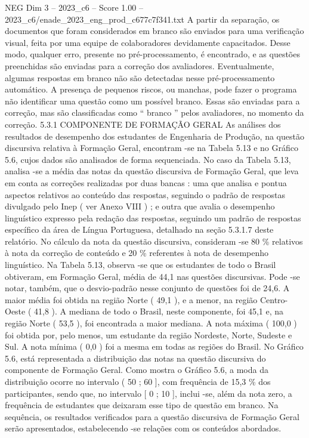 \begin{textsample}{NEG Dim 3 – 2023\_c6 – Score 1.00 – 2023\_c6/enade\_2023\_eng\_prod\_c677c7f341.txt}
A partir da separação, os documentos que foram considerados em branco são enviados para uma verificação visual, feita por uma equipe de colaboradores devidamente capacitados.
Desse modo, qualquer erro, presente no pré-processamento, é encontrado, e as questões preenchidas são enviadas para a correção dos avaliadores.
Eventualmente, algumas respostas em branco não são detectadas nesse pré-processamento automático.
A presença de pequenos riscos, ou manchas, pode fazer o programa não identificar uma questão como um possível branco.
Essas são enviadas para a correção, mas são classificadas como “ branco ” pelos avaliadores, no momento da correção. 5.3.1 COMPONENTE DE FORMAÇÃO GERAL As análises dos resultados de desempenho dos estudantes de Engenharia de Produção, na questão discursiva relativa à Formação Geral, encontram -se na Tabela 5.13 e no Gráfico 5.6, cujos dados são analisados de forma sequenciada.
No caso da Tabela 5.13, analisa -se a média das notas da questão discursiva de Formação Geral, que leva em conta as correções realizadas por duas bancas : uma que analisa e pontua aspectos relativos ao conteúdo das respostas, seguindo o padrão de respostas divulgado pelo Inep ( ver Anexo VIII ) ; e outra que avalia o desempenho linguístico expresso pela redação das respostas, seguindo um padrão de respostas específico da área de Língua Portuguesa, detalhado na seção 5.3.1.7 deste relatório.
No cálculo da nota da questão discursiva, consideram -se 80 \% relativos à nota da correção de conteúdo e 20 \% referentes à nota de desempenho linguístico.
Na Tabela 5.13, observa -se que os estudantes de todo o Brasil obtiveram, em Formação Geral, média de 44,1 nas questões discursivas.
Pode -se notar, também, que o desvio-padrão nesse conjunto de questões foi de 24,6.
A maior média foi obtida na região Norte ( 49,1 ), e a menor, na região Centro-Oeste ( 41,8 ).
A mediana de todo o Brasil, neste componente, foi 45,1 e, na região Norte ( 53,5 ), foi encontrada a maior mediana.
A nota máxima ( 100,0 ) foi obtida por, pelo menos, um estudante da região Nordeste, Norte, Sudeste e Sul.
A nota mínima ( 0,0 ) foi a mesma em todas as regiões do Brasil.
No Gráfico 5.6, está representada a distribuição das notas na questão discursiva do componente de Formação Geral.
Como mostra o Gráfico 5.6, a moda da distribuição ocorre no intervalo ( 50 ; 60 ], com frequência de 15,3 \% dos participantes, sendo que, no intervalo [ 0 ; 10 ], inclui -se, além da nota zero, a frequência de estudantes que deixaram esse tipo de questão em branco.
Na sequência, os resultados verificados para a questão discursiva de Formação Geral serão apresentados, estabelecendo -se relações com os conteúdos abordados.

\end{textsample}
